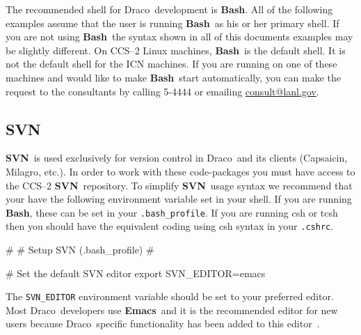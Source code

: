 \documentclass[11pt]{nmemo}
\newcommand{\comp}[1]{\normalfont\footnotesize\texttt{#1}\normalsize}
\newcommand{\draco}{{\normalfont\sffamily Draco}}
\newcommand{\capsaicin}{{\normalfont\sffamily Capsaicin}}
\newcommand{\milagro}{{\normalfont\sffamily Milagro}}
\newcommand{\svn}{{\normalfont\bfseries SVN}}
\newcommand{\emacs}{{\normalfont\bfseries Emacs}}
\newcommand{\bash}{{\normalfont\bfseries Bash}}
\newenvironment{codeExample} %
{\footnotesize 
  \VerbatimEnvironment
  \begin{SaveVerbatim}{\mycode}}%
  {\end{SaveVerbatim}%
  \noindent%
  \parashade[.950]{sharpcorners}{\gdef\outlineboxwidth{.5}%
    \UseVerbatim{\mycode}}\normalsize}
\begin{document}
The recommended shell for \draco\ development is \bash.  All of the
following examples assume that the user is running \bash\ as his or
her primary shell.  If you are not using \bash\ the syntax shown in
all of this documents examples may be slightly different.  On CCS--2
Linux machines, \bash\ is the default shell.  It is not the default
shell for the ICN machines.  If you are running on one of these
machines and would like to make \bash\ start automatically, you can
make the request to the consultants by calling 5-4444 or emailing
\url{consult@lanl.gov}.




\subsection{SVN}

\svn\ is used exclusively for version control in \draco\ and its
clients (\capsaicin, \milagro, etc.).  In order to work with
these code-packages you must have access to the CCS--2 \svn\ 
repository.  To simplify \svn\ usage syntax we recommend that your
have the following environment variable set in your shell.  If you
are running \bash, these can be set in your \comp{.bash\_profile}.
If you are running csh or tcsh then you should have the equivalent
coding using csh syntax in your \comp{.cshrc}.
%
\begin{codeExample}
#
# Setup SVN (.bash_profile)
#

# Set the default SVN editor
export SVN_EDITOR=emacs
\end{codeExample}
%

%
The \comp{SVN\_EDITOR} environment variable should be set to your
preferred editor.  Most \draco\ developers use \emacs\ and it is the
recommended editor for new users because \draco\ specific
functionality has been added to this editor~\cite{xtm:9909}.
\end{document}
